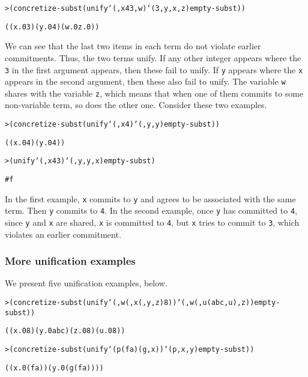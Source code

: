 \begin{alltt}
> (concretize-subst (unify `(,x 4 3 ,w) `(3 ,y ,x ,z) empty-subst))

((x.0 3) (y.0 4) (w.0 z.0))
\end{alltt}

\noindent
We can see that the last two items in each term do not violate earlier
commitments.  Thus, the two terms unify.  If any other integer appears
where the \texttt{3} in the first argument appears, then these fail to
unify.  If \texttt{y} appears where the \texttt{x} appears in the
second argument, then these also fail to unify.  The variable
\texttt{w} shares with the variable \texttt{z}, which means that when
one of them commits to some non-variable term, so does the other
one. Consider these two examples.

\begin{alltt}
> (concretize-subst (unify `(,x 4) `(,y ,y) empty-subst))

((x.0 4) (y.0 4))
\end{alltt}

\begin{alltt}
> (unify `(,x 4 3) `(,y ,y ,x) empty-subst)

#f
\end{alltt}
\noindent

\noindent
In the first example, \texttt{x} commits to \texttt{y} and agrees to
be associated with the same term.  Then \texttt{y} commits to
\texttt{4}.  In the second example, once \texttt{y} has committed to
\texttt{4}, since \texttt{y} and \texttt{x} are shared, \texttt{x} is
committed to \texttt{4}, but \texttt{x} tries to commit to \texttt{3},
which violates an earlier commitment.

\subsubsection{More unification examples}

We present five unification examples, below.

\begin{alltt}
> (concretize-subst (unify `(,w (,x (,y ,z) 8)) `(,w (,u (abc ,u) ,z)) empty-subst))

((x.0 8) (y.0 abc) (z.0 8) (u.0 8))
\end{alltt}

\begin{alltt}
> (concretize-subst (unify `(p (f a) (g ,x)) `(p ,x ,y) empty-subst))

((x.0 (f a)) (y.0 (g (f a))))
\end{alltt}

